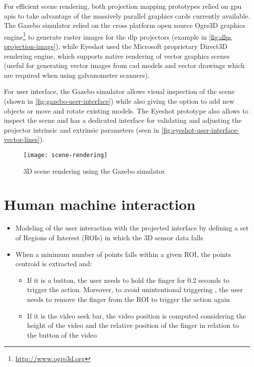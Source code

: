For efficient scene rendering, both projection mapping prototypes relied on \gls{gpu} \glspl{api} to take advantage of the massively parallel graphics cards currently available. The Gazebo simulator relied on the cross platform open source Ogre3D graphics engine\footnote{\url{http://www.ogre3d.org}} to generate raster images for the \gls{dlp} projectors (example in \cref{fig:dlp-projection-image}), while Eyeshot used the Microsoft proprietary Direct3D rendering engine, which supports native rendering of vector graphics scenes (useful for generating vector images from \gls{cad} models and vector drawings which are required when using galvanometer scanners).

For user interface, the Gazebo simulator allows visual inspection of the scene (shown in \cref{fig:gazebo-user-interface}) while also giving the option to add new objects or move and rotate existing models. The Eyeshot prototype also allows to inspect the scene and has a dedicated interface for validating and adjusting the projector intrinsic and extrinsic parameters (seen in \cref{fig:eyeshot-user-interface-vector-lines}).


\begin{figure}
	\centering
	\texttt{[image: scene-rendering]}
	\caption{3D scene rendering using the Gazebo simulator}
	\label{fig:scene-rendering}
\end{figure}



\section{Human machine interaction}

\begin{itemize}
	\item Modeling of the user interaction with the projected interface by defining a set of Regions of Interest (ROIs) in which the 3D sensor data falls
	\item When a minimum number of points falls within a given ROI, the points centroid is extracted and:
	\begin{itemize}
		\item If it is a button, the user needs to hold the finger for 0.2 seconds to trigger the action. Moreover, to avoid unintentional triggering , the user needs to remove the finger from the ROI to trigger the action again
		\item If it is the video seek bar, the video position is computed considering the height of the video and the relative position of the finger in relation to the button of the video
	\end{itemize}
\end{itemize}

